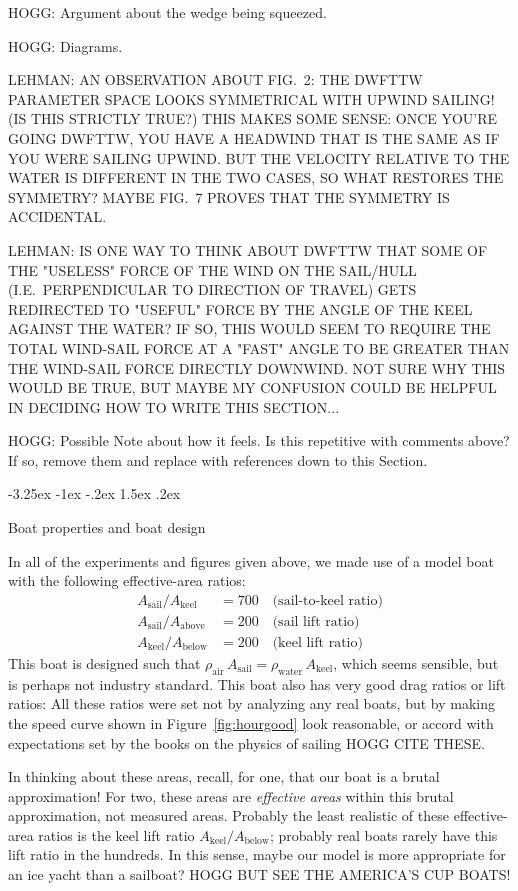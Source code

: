 \documentclass[letterpaper]{article}
\makeatletter
\newcommand{\air}{\text{air}}
\newcommand{\water}{\text{water}}
\newcommand{\sail}{\text{sail}}
\newcommand{\keel}{\text{keel}}
\renewcommand{\above}{\text{above}}
\newcommand{\below}{\text{below}}
\newcommand{\figref}[1]{Figure~\ref{#1}}
\renewcommand\section{\@startsection {section}{1}{\z@}%
  {-3.25ex \@plus -1ex \@minus -.2ex}%
  {1.5ex \@plus .2ex}%
  {\raggedright\normalfont\large\bfseries}}
\makeatother
\begin{document}
HOGG: Argument about the wedge being squeezed.

HOGG: Diagrams.

LEHMAN: AN OBSERVATION ABOUT FIG.~2: THE DWFTTW PARAMETER SPACE LOOKS SYMMETRICAL WITH UPWIND SAILING! (IS THIS STRICTLY TRUE?) THIS MAKES SOME SENSE: ONCE YOU'RE GOING DWFTTW, YOU HAVE A HEADWIND THAT IS THE SAME AS IF YOU WERE SAILING UPWIND. BUT THE VELOCITY RELATIVE TO THE WATER IS DIFFERENT IN THE TWO CASES, SO WHAT RESTORES THE SYMMETRY? MAYBE FIG.~7 PROVES THAT THE SYMMETRY IS ACCIDENTAL.

LEHMAN: IS ONE WAY TO THINK ABOUT DWFTTW THAT SOME OF THE "USELESS" FORCE OF THE WIND ON THE SAIL/HULL (I.E.~PERPENDICULAR TO DIRECTION OF TRAVEL) GETS REDIRECTED TO "USEFUL" FORCE BY THE ANGLE OF THE KEEL AGAINST THE WATER? IF SO, THIS WOULD SEEM TO REQUIRE THE TOTAL WIND-SAIL FORCE AT A "FAST" ANGLE TO BE GREATER THAN THE WIND-SAIL FORCE DIRECTLY DOWNWIND. NOT SURE WHY THIS WOULD BE TRUE, BUT MAYBE MY CONFUSION COULD BE HELPFUL IN DECIDING HOW TO WRITE THIS SECTION...

HOGG: Possible Note about how it feels. Is this repetitive with comments above? If so, remove them and replace with references down to this Section.

\section{Boat properties and boat design}\label{sec:design}

In all of the experiments and figures given above, we made use of a model boat with the following effective-area ratios:
\begin{align}
  A_\sail / A_\keel &= 700 \quad\mbox{(sail-to-keel ratio)}\label{eq:boat1}\\
  A_\sail / A_\above &= 200 \quad\mbox{(sail lift ratio)}\\
  A_\keel / A_\below &= 200 \quad\mbox{(keel lift ratio)}\label{eq:boat4}
\end{align}
This boat is designed such that $\rho_\air\,A_\sail = \rho_\water\,A_\keel$, which seems sensible, but is perhaps not industry standard.
This boat also has very good drag ratios or lift ratios:
All these ratios were set not by analyzing any real boats, but by making the speed curve shown in \figref{fig:hourgood} look reasonable, or accord with expectations set by the books on the physics of sailing HOGG CITE THESE.

In thinking about these areas, recall, for one, that our boat is a brutal approximation!
For two, these areas are \emph{effective areas} within this brutal approximation, not measured areas.
Probably the least realistic of these effective-area ratios is the keel lift ratio $A_\keel/A_\below$; probably real boats rarely have this lift ratio in the hundreds.
In this sense, maybe our model is more appropriate for an ice yacht than a sailboat?
HOGG BUT SEE THE AMERICA'S CUP BOATS!
\end{document}

